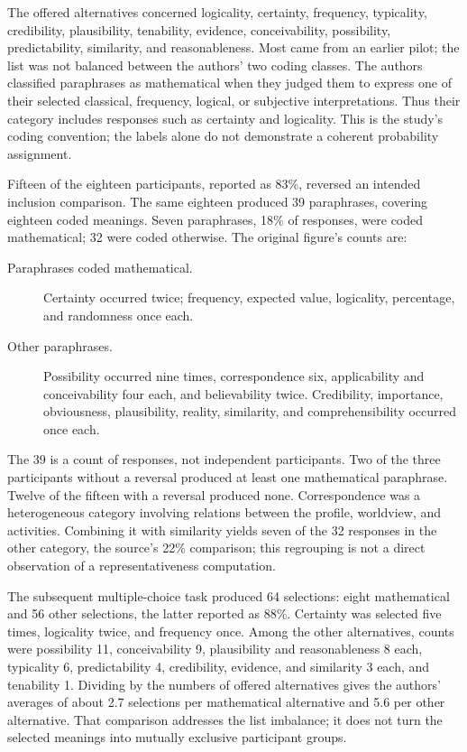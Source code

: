 The offered alternatives concerned logicality, certainty, frequency,
typicality, credibility, plausibility, tenability, evidence,
conceivability, possibility, predictability, similarity, and
reasonableness. Most came from an earlier pilot; the list was not
balanced between the authors' two coding classes.
The authors classified paraphrases as mathematical when they judged
them to express one of their selected classical, frequency, logical,
or subjective interpretations. Thus their category includes responses
such as certainty and logicality. This is the study's coding convention;
the labels alone do not demonstrate a coherent probability assignment.

Fifteen of the eighteen participants, reported as 83\%, reversed an
intended inclusion comparison. The same eighteen produced 39
paraphrases, covering eighteen coded meanings. Seven paraphrases,
18\% of responses, were coded mathematical; 32 were coded otherwise.
The original figure's counts are:

\begin{description}
\item[Paraphrases coded mathematical.]
Certainty occurred twice; frequency, expected value, logicality,
percentage, and randomness once each.
\item[Other paraphrases.]
Possibility occurred nine times, correspondence six, applicability
and conceivability four each, and believability twice.
Credibility, importance, obviousness, plausibility, reality,
similarity, and comprehensibility occurred once each.
\end{description}

The 39 is a count of responses, not independent participants.
Two of the three participants without a reversal produced at least
one mathematical paraphrase. Twelve of the fifteen with a reversal
produced none. Correspondence was a heterogeneous category involving
relations between the profile, worldview, and activities.
Combining it with similarity yields seven of the 32 responses in the
other category, the source's 22\% comparison; this regrouping is not
a direct observation of a representativeness computation.

The subsequent multiple-choice task produced 64 selections:
eight mathematical and 56 other selections, the latter reported as
88\%. Certainty was selected five times, logicality twice, and
frequency once. Among the other alternatives, counts were possibility
11, conceivability 9, plausibility and reasonableness 8 each,
typicality 6, predictability 4, credibility, evidence, and similarity
3 each, and tenability 1. Dividing by the numbers of offered
alternatives gives the authors' averages of about 2.7 selections per
mathematical alternative and 5.6 per other alternative.
That comparison addresses the list imbalance; it does not turn the
selected meanings into mutually exclusive participant groups.

